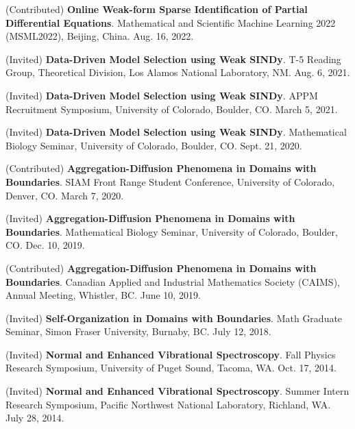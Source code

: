 \documentclass[letterpaper,11pt,oneside]{article}
\begin{document}
\begin{enumerate}[label={[\arabic*]}]
\item (Contributed) \textbf{Online Weak-form Sparse Identification of Partial Differential Equations}. Mathematical and Scientific Machine Learning 2022 (MSML2022), Beijing, China. Aug. 16, 2022.
\item (Invited) \textbf{Data-Driven Model Selection using Weak SINDy}. T-5 Reading Group, Theoretical Division, Los Alamos National Laboratory, NM. Aug. 6, 2021.
\item (Invited) \textbf{Data-Driven Model Selection using Weak SINDy}. APPM Recruitment Symposium, University of Colorado, Boulder, CO. March 5, 2021.
\item (Invited) \textbf{Data-Driven Model Selection using Weak SINDy}. Mathematical Biology Seminar, University of Colorado, Boulder, CO. Sept. 21, 2020.
\item (Contributed) \textbf{Aggregation-Diffusion Phenomena in Domains with Boundaries}. SIAM Front Range Student Conference, University of Colorado, Denver, CO. March 7, 2020.
\item (Invited) \textbf{Aggregation-Diffusion Phenomena in Domains with Boundaries}. Mathematical Biology Seminar, University of Colorado, Boulder, CO. Dec. 10, 2019.
\item (Contributed) \textbf{Aggregation-Diffusion Phenomena in Domains with Boundaries}. Canadian Applied and Industrial Mathematics Society (CAIMS), Annual Meeting, Whistler, BC. June 10, 2019.
\item (Invited) \textbf{Self-Organization in Domains with Boundaries}. Math Graduate Seminar, Simon Fraser University, Burnaby, BC. July 12, 2018.
\item (Invited) \textbf{Normal and Enhanced Vibrational Spectroscopy}. Fall Physics Research Symposium, University of Puget Sound, Tacoma, WA. Oct. 17, 2014.
\item (Invited) \textbf{Normal and Enhanced Vibrational Spectroscopy}. Summer Intern Research Symposium, Pacific Northwest National Laboratory, Richland, WA. July 28, 2014.
\end{enumerate}
\end{document}
